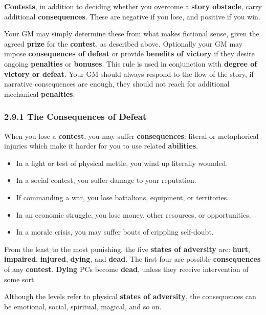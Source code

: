 \documentclass[
]{article}
\providecommand{\tightlist}{%
  \setlength{\itemsep}{0pt}\setlength{\parskip}{0pt}}
\begin{document}
\textbf{Contests}, in addition to deciding whether you overcome a
\textbf{story obstacle}, carry additional \textbf{consequences}. These
are negative if you lose, and positive if you win.

Your GM may simply determine these from what makes fictional sense,
given the agreed \textbf{prize} for the \textbf{contest}, as described
above. Optionally your GM may impose \textbf{consequences of defeat} or
provide \textbf{benefits of victory} if they desire ongoing
\textbf{penalties} or \textbf{bonuses}. This rule is used in conjunction
with \textbf{degree of victory or defeat}. Your GM should always respond
to the flow of the story, if narrative consequences are enough, they
should not reach for additional mechanical \textbf{penalties}.

\hypertarget{the-consequences-of-defeat}{%
\subsubsection{2.9.1 The Consequences of
Defeat}\label{the-consequences-of-defeat}}

When you lose a \textbf{contest}, you may suffer \textbf{consequences}:
literal or metaphorical injuries which make it harder for you to use
related \textbf{abilities}.

\begin{itemize}
\tightlist
\item
  In a fight or test of physical mettle, you wind up literally wounded.
\item
  In a social contest, you suffer damage to your reputation.
\item
  If commanding a war, you lose battalions, equipment, or territories.
\item
  In an economic struggle, you lose money, other resources, or
  opportunities.
\item
  In a morale crisis, you may suffer bouts of crippling self-doubt.
\end{itemize}

From the least to the most punishing, the five \textbf{states of
adversity} are: \textbf{hurt}, \textbf{impaired}, \textbf{injured},
\textbf{dying}, and \textbf{dead}. The first four are possible
\textbf{consequences} of any \textbf{contest}. \textbf{Dying} PCs become
\textbf{dead}, unless they receive intervention of some sort.

Although the levels refer to physical \textbf{states of adversity}, the
consequences can be emotional, social, spiritual, magical, and so on.
\end{document}
